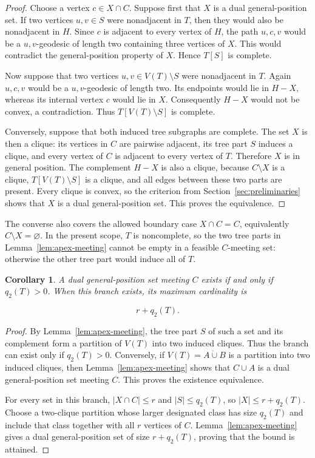 \documentclass[11pt,a4paper]{article}
\newtheorem{corollary}[theorem]{Corollary}
\numberwithin{equation}{section}
\begin{document}
\begin{proof}
Choose a vertex \(c\in X\cap C\). Suppose first that
\(X\) is a dual general-position set. If two vertices \(u,v\in S\) were
nonadjacent in \(T\), then they would also be nonadjacent in \(H\).
Since \(c\) is adjacent to every vertex of \(H\), the path \(u,c,v\)
would be a \(u,v\)-geodesic of length two containing three vertices of
\(X\). This would contradict the general-position property of \(X\).
Hence \(T[S]\) is complete.

Now suppose that two vertices \(u,v\in V(T)\setminus S\) were
nonadjacent in \(T\). Again \(u,c,v\) would be a \(u,v\)-geodesic of
length two. Its endpoints would lie in \(H-X\), whereas its internal
vertex \(c\) would lie in \(X\). Consequently \(H-X\) would not be
convex, a contradiction. Thus \(T[V(T)\setminus S]\) is complete.

Conversely, suppose that both induced tree subgraphs are complete. The
set \(X\) is then a clique: its vertices in \(C\) are pairwise adjacent,
its tree part \(S\) induces a clique, and every vertex of \(C\) is
adjacent to every vertex of \(T\). Therefore \(X\) is in general
position. The complement \(H-X\) is also a clique, because
\(C\setminus X\) is a clique, \(T[V(T)\setminus S]\) is a clique, and
all edges between these two parts are present. Every clique is convex,
so the criterion from Section~\ref{sec:preliminaries} shows that \(X\) is a dual
general-position set. This proves the equivalence.
\end{proof}

The converse also covers the allowed boundary case \(X\cap C=C\),
equivalently \(C\setminus X=\varnothing\). In the
present scope, \(T\) is noncomplete, so the two tree parts in Lemma~\ref{lem:apex-meeting}
cannot be empty in a feasible \(C\)-meeting set: otherwise the other tree
part would induce all of \(T\).

\begin{corollary}\label{cor:apex-meeting-maximum}
A dual general-position set meeting \(C\) exists
if and only if \(q_2(T)>0\). When this branch exists, its maximum
cardinality is

\[
r+q_2(T).
\]
\end{corollary}

\begin{proof}
By Lemma~\ref{lem:apex-meeting}, the tree part \(S\) of such a set and its
complement form a partition of \(V(T)\) into two induced cliques. Thus
the branch can exist only if \(q_2(T)>0\). Conversely, if
\(V(T)=A\mathbin{\dot\cup}B\) is a partition into two induced cliques,
then Lemma~\ref{lem:apex-meeting} shows that \(C\cup A\) is a dual general-position set
meeting \(C\). This proves the existence equivalence.

For every set in this branch, \(|X\cap C|\le r\) and \(|S|\le q_2(T)\),
so \(|X|\le r+q_2(T)\). Choose a two-clique partition whose larger
designated class has size \(q_2(T)\) and include that class together
with all \(r\) vertices of \(C\). Lemma~\ref{lem:apex-meeting} gives a dual
general-position set of size \(r+q_2(T)\), proving that the bound is
attained.
\end{proof}
\end{document}
